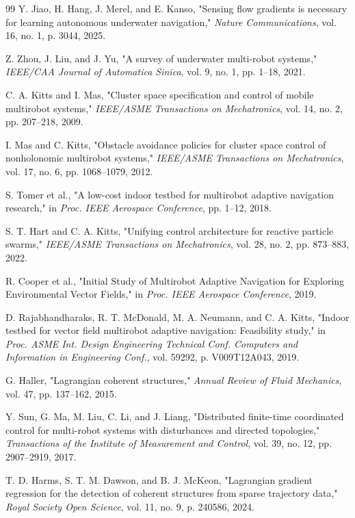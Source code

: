 \documentclass[12pt, letterpaper, oneside]{report}
\begin{document}
\begin{thebibliography}{99}
 Y. Jiao, H. Hang, J. Merel, and E. Kanso, "Sensing flow gradients is necessary for learning autonomous underwater navigation," \textit{Nature Communications}, vol. 16, no. 1, p. 3044, 2025.

 Z. Zhou, J. Liu, and J. Yu, "A survey of underwater multi-robot systems," \textit{IEEE/CAA Journal of Automatica Sinica}, vol. 9, no. 1, pp. 1--18, 2021.

 C. A. Kitts and I. Mas, "Cluster space specification and control of mobile multirobot systems," \textit{IEEE/ASME Transactions on Mechatronics}, vol. 14, no. 2, pp. 207--218, 2009.

 I. Mas and C. Kitts, "Obstacle avoidance policies for cluster space control of nonholonomic multirobot systems," \textit{IEEE/ASME Transactions on Mechatronics}, vol. 17, no. 6, pp. 1068--1079, 2012.

 S. Tomer et al., "A low-cost indoor testbed for multirobot adaptive navigation research," in \textit{Proc. IEEE Aerospace Conference}, pp. 1--12, 2018.

 S. T. Hart and C. A. Kitts, "Unifying control architecture for reactive particle swarms," \textit{IEEE/ASME Transactions on Mechatronics}, vol. 28, no. 2, pp. 873--883, 2022.

 R. Cooper et al., "Initial Study of Multirobot Adaptive Navigation for Exploring Environmental Vector Fields," in \textit{Proc. IEEE Aerospace Conference}, 2019.

 D. Rajabhandharaks, R. T. McDonald, M. A. Neumann, and C. A. Kitts, "Indoor testbed for vector field multirobot adaptive navigation: Feasibility study," in \textit{Proc. ASME Int. Design Engineering Technical Conf. Computers and Information in Engineering Conf.}, vol. 59292, p. V009T12A043, 2019.

 G. Haller, "Lagrangian coherent structures," \textit{Annual
Review of Fluid Mechanics}, vol. 47, pp. 137--162, 2015.

 Y. Sun, G. Ma, M. Liu, C. Li, and J. Liang, "Distributed
finite-time coordinated control for multi-robot systems with disturbances
and directed topologies," \textit{Transactions of the Institute of
Measurement and Control}, vol. 39, no. 12, pp. 2907--2919, 2017.

 T. D. Harms, S. T. M. Dawson, and B. J. McKeon, "Lagrangian
gradient regression for the detection of coherent structures from sparse
trajectory data," \textit{Royal Society Open Science}, vol. 11, no. 9,
p. 240586, 2024.


\end{thebibliography}
\end{document}
